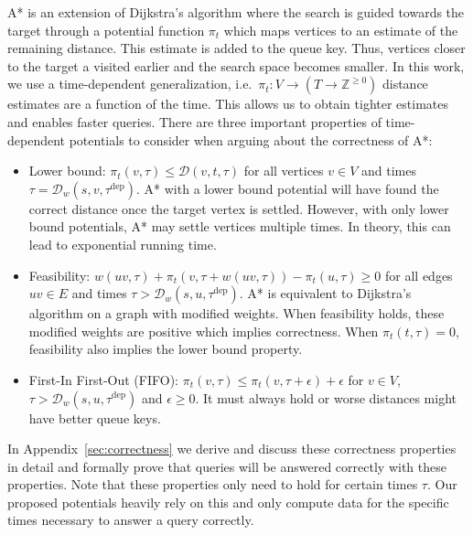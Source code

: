 \documentclass[a4paper,UKenglish,cleveref, autoref, thm-restate,anonymous]{lipics-v2021}
\newcommand*{\dist}{\mathcal{D}}
\newcommand*{\tdep}{\tau^{\operatorname{dep}}}
\begin{document}
A* is an extension of Dijkstra's algorithm where the search is guided towards the target through a potential function $\pi_t$ which maps vertices to an estimate of the remaining distance.
This estimate is added to the queue key.
Thus, vertices closer to the target a visited earlier and the search space becomes smaller.
%
In this work, we use a time-dependent generalization, i.e.\ $\pi_t : V \to (T \to \mathbb{Z}^{\geq 0})$ distance estimates are a function of the time.
This allows us to obtain tighter estimates and enables faster queries.
There are three important properties of time-dependent potentials to consider when arguing about the correctness of A*:
\begin{itemize}
  \item Lower bound: $\pi_t(v, \tau) \leq \dist(v,t,\tau)$ for all vertices $v \in V$ and times $\tau = \dist_w(s,v,\tdep)$.
  A* with a lower bound potential will have found the correct distance once the target vertex is settled.
  However, with only lower bound potentials, A* may settle vertices multiple times.
  In theory, this can lead to exponential running time.
  \item Feasibility: $w(uv, \tau) + \pi_t(v, \tau + w(uv, \tau)) - \pi_t(u, \tau) \geq 0$ for all edges $uv \in E$ and times $\tau > \dist_w(s,u,\tdep)$.
  A* is equivalent to Dijkstra's algorithm on a graph with modified weights.
  When feasibility holds, these modified weights are positive which implies correctness.
  When $\pi_t(t, \tau) = 0$, feasibility also implies the lower bound property.
  \item First-In First-Out (FIFO): $\pi_t(v, \tau) \leq \pi_t(v, \tau + \epsilon) + \epsilon$ for $v \in V$, $\tau > \dist_w(s,u,\tdep)$ and $\epsilon \geq 0$.
  It must always hold or worse distances might have better queue keys.
\end{itemize}
In Appendix~\ref{sec:correctness} we derive and discuss these correctness properties in detail and formally prove that queries will be answered correctly with these properties.
Note that these properties only need to hold for certain times $\tau$.
Our proposed potentials heavily rely on this and only compute data for the specific times necessary to answer a query correctly.

\end{document}
